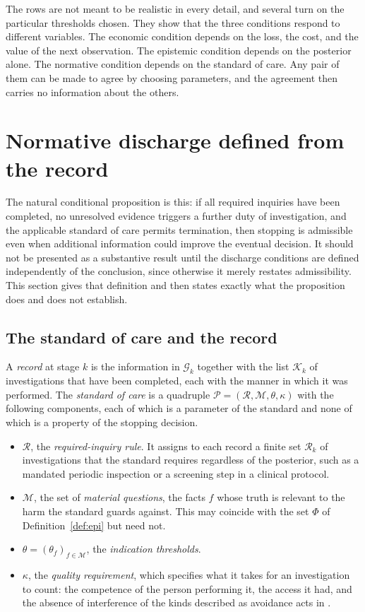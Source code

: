 \documentclass[11pt]{article}
\newcommand{\G}{\mathcal G}
\theoremstyle{plain}
\theoremstyle{definition}
\begin{document}
The rows are not meant to be realistic in every detail, and several turn on the particular thresholds chosen. They show that the three conditions respond to different variables. The economic condition depends on the loss, the cost, and the value of the next observation. The epistemic condition depends on the posterior alone. The normative condition depends on the standard of care. Any pair of them can be made to agree by choosing parameters, and the agreement then carries no information about the others.

\section{Normative discharge defined from the record}\label{sec:discharge}

The natural conditional proposition is this: if all required inquiries have been completed, no unresolved evidence triggers a further duty of investigation, and the applicable standard of care permits termination, then stopping is admissible even when additional information could improve the eventual decision. It should not be presented as a substantive result until the discharge conditions are defined independently of the conclusion, since otherwise it merely restates admissibility. This section gives that definition and then states exactly what the proposition does and does not establish.

\subsection{The standard of care and the record}

A \emph{record} at stage $k$ is the information in $\G_k$ together with the list $\mathcal K_k$ of investigations that have been completed, each with the manner in which it was performed. The \emph{standard of care} is a quadruple $\mathcal P=(\mathcal R,\mathcal M,\theta,\kappa)$ with the following components, each of which is a parameter of the standard and none of which is a property of the stopping decision.
\begin{itemize}[nosep]
\item $\mathcal R$, the \emph{required-inquiry rule}. It assigns to each record a finite set $\mathcal R_k$ of investigations that the standard requires regardless of the posterior, such as a mandated periodic inspection or a screening step in a clinical protocol.
\item $\mathcal M$, the set of \emph{material questions}, the facts $f$ whose truth is relevant to the harm the standard guards against. This may coincide with the set $\Phi$ of Definition~\ref{def:epi} but need not.
\item $\theta=(\theta_f)_{f\in\mathcal M}$, the \emph{indication thresholds}.
\item $\kappa$, the \emph{quality requirement}, which specifies what it takes for an investigation to count: the competence of the person performing it, the access it had, and the absence of interference of the kinds described as avoidance acts in \cite{flyxion2026law}.
\end{itemize}
\end{document}

